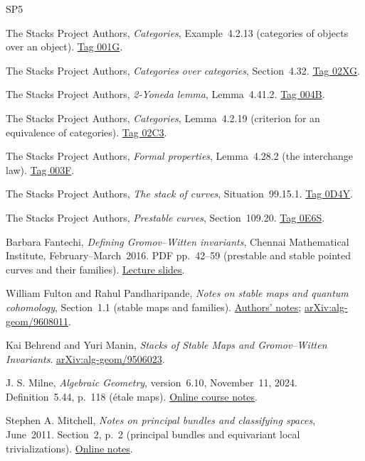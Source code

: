 \documentclass[12pt]{memoir}
\begin{document}
\begingroup
\renewcommand{\bibname}{Notes Bibliography}
\begin{thebibliography}{SP5}

The Stacks Project Authors, \emph{Categories}, Example~4.2.13 (categories of objects over an object).
\href{https://stacks.math.columbia.edu/tag/001G}{Tag 001G}.

The Stacks Project Authors, \emph{Categories over categories}, Section~4.32.
\href{https://stacks.math.columbia.edu/tag/02XG}{Tag 02XG}.

The Stacks Project Authors, \emph{2-Yoneda lemma}, Lemma~4.41.2.
\href{https://stacks.math.columbia.edu/tag/004B}{Tag 004B}.

The Stacks Project Authors, \emph{Categories}, Lemma~4.2.19 (criterion for an equivalence of categories).
\href{https://stacks.math.columbia.edu/tag/02C3}{Tag 02C3}.

The Stacks Project Authors, \emph{Formal properties}, Lemma~4.28.2 (the interchange law).
\href{https://stacks.math.columbia.edu/tag/003F}{Tag 003F}.

The Stacks Project Authors, \emph{The stack of curves}, Situation~99.15.1.
\href{https://stacks.math.columbia.edu/tag/0D4Y}{Tag 0D4Y}.

The Stacks Project Authors, \emph{Prestable curves}, Section~109.20.
\href{https://stacks.math.columbia.edu/tag/0E6S}{Tag 0E6S}.

Barbara Fantechi, \emph{Defining Gromov--Witten invariants}, Chennai Mathematical Institute, February--March~2016.
PDF pp.~42--59 (prestable and stable pointed curves and their families).
\href{https://www.cmi.ac.in/~mathsem/fantechi2016/chennai_2016_1.pdf}{Lecture slides}.

William Fulton and Rahul Pandharipande, \emph{Notes on stable maps and quantum cohomology}, Section~1.1 (stable maps and families).
\href{https://people.math.ethz.ch/~rahul/sm.pdf}{Authors' notes};
\href{https://arxiv.org/abs/alg-geom/9608011}{arXiv:alg-geom/9608011}.

Kai Behrend and Yuri Manin, \emph{Stacks of Stable Maps and Gromov--Witten Invariants}.
\href{https://arxiv.org/abs/alg-geom/9506023}{arXiv:alg-geom/9506023}.

J. S. Milne, \emph{Algebraic Geometry}, version~6.10, November~11, 2024.
Definition~5.44, p.~118 (\'etale maps).
\href{https://www.jmilne.org/math/CourseNotes/AG.pdf}{Online course notes}.

Stephen A. Mitchell, \emph{Notes on principal bundles and classifying spaces}, June~2011.
Section~2, p.~2 (principal bundles and equivariant local trivializations).
\href{https://sites.math.washington.edu/~mitchell/Notes/prin.pdf}{Online notes}.

\end{thebibliography}
\endgroup
\end{document}
